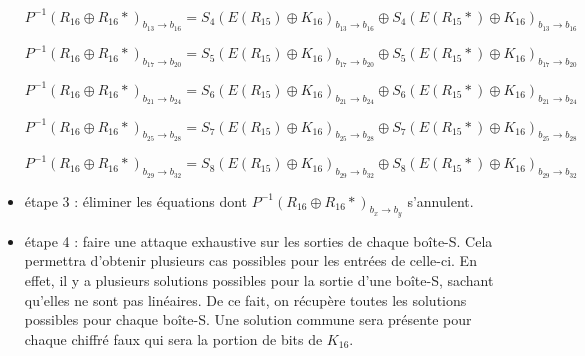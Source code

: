 \documentclass[11pt]{article}
\begin{document}
\begin{itemize}
	$P^{-1}(R_{16}\oplus R_{16}*)_{b_{13}\to b_{16}} = S_4(E(R_{15})\oplus K_{16})_{b_{13}\to b_{16}} \oplus S_4(E(R_{15}*)\oplus K_{16})_{b_{13}\to b_{16}}$
			
	$P^{-1}(R_{16}\oplus R_{16}*)_{b_{17}\to b_{20}} = S_5(E(R_{15})\oplus K_{16})_{b_{17}\to b_{20}} \oplus S_5(E(R_{15}*)\oplus K_{16})_{b_{17}\to b_{20}}$
				
	$P^{-1}(R_{16}\oplus R_{16}*)_{b_{21}\to b_{24}} = S_6(E(R_{15})\oplus K_{16})_{b_{21}\to b_{24}} \oplus S_6(E(R_{15}*)\oplus K_{16})_{b_{21}\to b_{24}}$
					
	$P^{-1}(R_{16}\oplus R_{16}*)_{b_{25}\to b_{28}} = S_7(E(R_{15})\oplus K_{16})_{b_{25}\to b_{28}} \oplus S_7(E(R_{15}*)\oplus K_{16})_{b_{25}\to b_{28}}$
						
	$P^{-1}(R_{16}\oplus R_{16}*)_{b_{29}\to b_{32}} = S_8(E(R_{15})\oplus K_{16})_{b_{29}\to b_{32}} \oplus S_8(E(R_{15}*)\oplus K_{16})_{b_{29}\to b_{32}}$ \newline
	
	\item étape 3 : éliminer les équations dont $P^{-1}(R_{16}\oplus R_{16}*)_{b_x\to b_y}$ s'annulent. \newline
	
	\item étape 4 : faire une attaque exhaustive sur les sorties de chaque boîte-S. Cela permettra d'obtenir plusieurs cas possibles pour les entrées de celle-ci. En effet, il y a plusieurs solutions possibles pour la sortie d'une boîte-S, sachant qu'elles ne sont pas linéaires. De ce fait, on récupère toutes les solutions possibles pour chaque boîte-S. Une solution commune sera présente pour chaque chiffré faux qui sera la portion de bits de $K_{16}$. 
	

\end{itemize}
\end{document}
